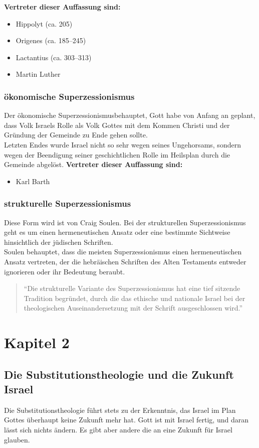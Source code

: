 \documentclass{../../inc/mybib}
\newcommand{\st}{Substitutionstheolog}
\newcommand{\sz}{Superzessionismus}
\begin{document}
    \textbf{Vertreter dieser Auffassung sind:}
    \begin{itemize}
        \item Hippolyt (ca. 205)
        \item Origenes (ca. 185--245)
        \item Lactantius (ca. 303--313)
        \item Martin Luther
    \end{itemize}
    \subsubsection{ökonomische \sz}
    Der ökonomische \sz behauptet, Gott habe von Anfang an geplant, dass Volk Israels Rolle als Volk Gottes mit dem Kommen Christi und der Gründung der Gemeinde zu Ende gehen sollte.\\
    Letzten Endes wurde Israel nicht so sehr wegen seines Ungehorsams, sondern wegen der Beendigung seiner geschichtlichen Rolle im Heilsplan durch die Gemeinde abgelöst.
    \textbf{Vertreter dieser Auffassung sind:}
    \begin{itemize}        
        \item Karl Barth
    \end{itemize}
    \subsubsection{strukturelle \sz}
    Diese Form wird ist von Craig Soulen. Bei der strukturellen \sz{} geht es um einen hermeneutischen Ansatz oder eine bestimmte Sichtweise hinsichtlich der jüdischen Schriften.\\
    Soulen behauptet, dass die meisten \sz{} einen hermeneutischen Ansatz vertreten, der die hebräischen Schriften des Alten Testaments entweder ignorieren oder ihr Bedeutung beraubt.
    \begin{quote}
        \enquote{Die strukturelle Variante des \sz{} hat eine tief sitzende Tradition begründet, durch die das ethische und nationale Israel bei der theologischen Auseinandersetzung mit der Schrift ausgeschlossen wird.}
    \end{quote}
    \section{Kapitel 2}
    \subsection{Die \st ie und die Zukunft Israel}
    Die \st ie führt stets zu der Erkenntnis, das Israel im Plan Gottes überhaupt keine Zukunft mehr hat. Gott ist mit Israel fertig, und daran lässt sich nichts ändern.
    Es gibt aber andere die an eine Zukunft für Israel glauben.
\end{document}
